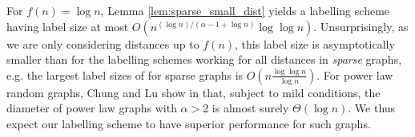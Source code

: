 For $f(n) = \log n$, Lemma \ref{lem:sparse_small_dist} yields a labelling scheme having label size
at most $O\left(n^{(\log n)/(\alpha - 1 + \log n)} \log\log n \right)$. Unsurprisingly, as we are only considering distances up
to $f(n)$, this label size is asymptotically smaller than for the labelling
schemes working for all distances in \emph{sparse} graphs, e.g. the largest label sizes of \cite{DBLP:journals/corr/GawrychowskiKU15} for sparse graphs is $O(n \frac{\log \log n}{ \log n})$.
For power law random graphs, Chung and Lu show in \cite{chung2004average} that, subject to mild conditions, the diameter of power law graphs with $\alpha > 2$ is almost surely $\Theta(\log n)$. We thus expect our labelling scheme to have
superior performance for such graphs.
